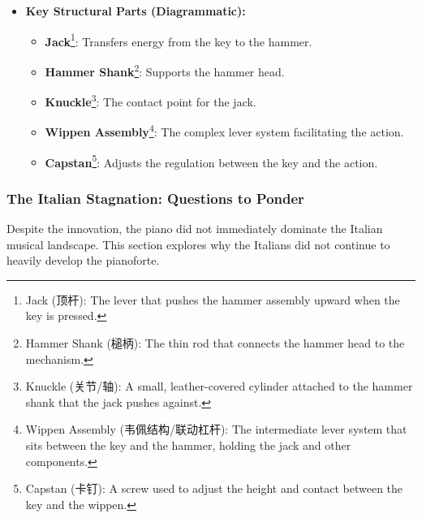 \documentclass[math,code]{amznotes}
\theoremstyle{remark}
\begin{document}
\begin{itemize}
\begin{itemize}
        \item Its purpose is to prevent the "hammer re-rebound," ensuring a clean single strike.
    \end{itemize}
    \item \textbf{Key Structural Parts (Diagrammatic):}
    \begin{itemize}
        \item \textbf{Jack}\footnote{Jack (顶杆): The lever that pushes the hammer assembly upward when the key is pressed.}: Transfers energy from the key to the hammer.
        \item \textbf{Hammer Shank}\footnote{Hammer Shank (槌柄): The thin rod that connects the hammer head to the mechanism.}: Supports the hammer head.
        \item \textbf{Knuckle}\footnote{Knuckle (关节/轴): A small, leather-covered cylinder attached to the hammer shank that the jack pushes against.}: The contact point for the jack.
        \item \textbf{Wippen Assembly}\footnote{Wippen Assembly (韦佩结构/联动杠杆): The intermediate lever system that sits between the key and the hammer, holding the jack and other components.}: The complex lever system facilitating the action.
        \item \textbf{Capstan}\footnote{Capstan (卡钉): A screw used to adjust the height and contact between the key and the wippen.}: Adjusts the regulation between the key and the action.
    \end{itemize}
\end{itemize}

\subsubsection{The Italian Stagnation: Questions to Ponder}

Despite the innovation, the piano did not immediately dominate the Italian musical landscape. This section explores why the Italians did not continue to heavily develop the pianoforte.
\end{document}
